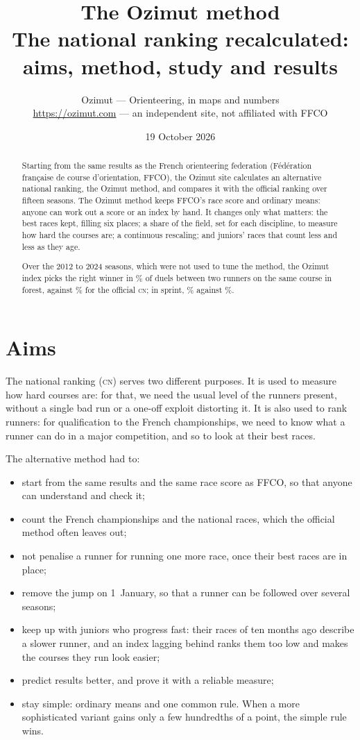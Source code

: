 \documentclass[11pt,a4paper]{article}
\title{The Ozimut method\\\large The national ranking recalculated: aims, method, study and results}
\author{Ozimut — Orienteering, in maps and numbers\\\small \url{https://ozimut.com} — an independent site, not affiliated with FFCO}
\date{19 October 2026}
\newcommand{\CN}{\textsc{cn}}
\begin{document}
\maketitle

\begin{abstract}
Starting from the same results as the French orienteering federation (Fédération française de course d'orientation, FFCO), the Ozimut site calculates an alternative national ranking, the Ozimut method, and compares it with the official ranking over fifteen seasons. The Ozimut method keeps FFCO's race score and ordinary means: anyone can work out a score or an index by hand. It changes only what matters: the best races kept, filling six places; a share of the field, set for each discipline, to measure how hard the courses are; a continuous rescaling; and juniors' races that count less and less as they age.

Over the 2012 to 2024 seasons, which were not used to tune the method, the Ozimut index picks the right winner in \NaccFtop\% of duels between two runners on the same course in forest, against \NaccFoff\% for the official \CN; in sprint, \NaccStop\% against \NaccSoff\%.
\end{abstract}

\tableofcontents

\section{Aims}

The national ranking (\CN) serves two different purposes. It is used to measure how hard courses are: for that, we need the usual level of the runners present, without a single bad run or a one-off exploit distorting it. It is also used to rank runners: for qualification to the French championships, we need to know what a runner can do in a major competition, and so to look at their best races.

The alternative method had to:
\begin{itemize}
  \item start from the same results and the same race score as FFCO, so that anyone can understand and check it;
  \item count the French championships and the national races, which the official method often leaves out;
  \item not penalise a runner for running one more race, once their best races are in place;
  \item remove the jump on 1~January, so that a runner can be followed over several seasons;
  \item keep up with juniors who progress fast: their races of ten months ago describe a slower runner, and an index lagging behind ranks them too low and makes the courses they run look easier;
  \item predict results better, and prove it with a reliable measure;
  \item stay simple: ordinary means and one common rule. When a more sophisticated variant gains only a few hundredths of a point, the simple rule wins.
\end{itemize}
\end{document}
